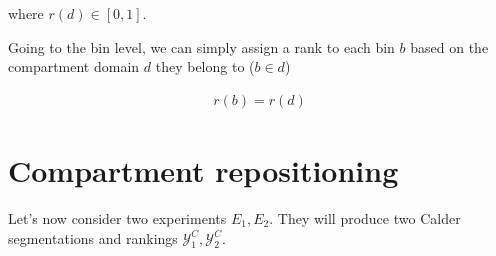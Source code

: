 \documentclass{article}
\begin{document}
where $r(d)\in [0, 1]$.

Going to the bin level, we can simply assign a rank to each bin $b$ based on the compartment domain $d$ they belong to ($b\in d$)

\begin{align*}
	r(b) = r(d)
\end{align*}




\section{Compartment repositioning}
Let's now consider two experiments $E_1, E_2$. They will produce two Calder segmentations and rankings $\mathcal{Y}^{C}_1, \mathcal{Y}^{C}_2$.
\end{document}
